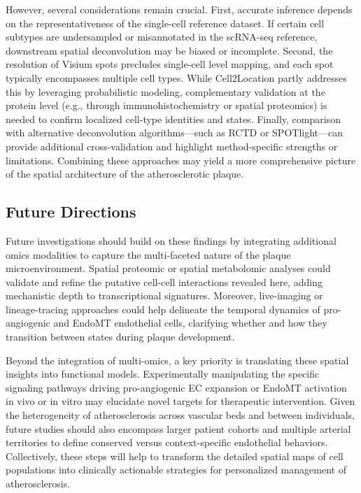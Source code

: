 \documentclass[a4paper,12pt]{article}
\begin{document}
However, several considerations remain crucial. First, accurate inference depends on the representativeness of the single-cell reference dataset. If certain cell subtypes are undersampled or misannotated in the scRNA-seq reference, downstream spatial deconvolution may be biased or incomplete. Second, the resolution of Visium spots precludes single-cell level mapping, and each spot typically encompasses multiple cell types. While Cell2Location partly addresses this by leveraging probabilistic modeling, complementary validation at the protein level (e.g., through immunohistochemistry or spatial proteomics) is needed to confirm localized cell-type identities and states. Finally, comparison with alternative deconvolution algorithms—such as RCTD or SPOTlight—can provide additional cross-validation and highlight method-specific strengths or limitations. Combining these approaches may yield a more comprehensive picture of the spatial architecture of the atherosclerotic plaque.

\subsection{Future Directions}
Future investigations should build on these findings by integrating additional omics modalities to capture the multi-faceted nature of the plaque microenvironment. Spatial proteomic or spatial metabolomic analyses could validate and refine the putative cell-cell interactions revealed here, adding mechanistic depth to transcriptional signatures. Moreover, live-imaging or lineage-tracing approaches could help delineate the temporal dynamics of pro-angiogenic and EndoMT endothelial cells, clarifying whether and how they transition between states during plaque development.

Beyond the integration of multi-omics, a key priority is translating these spatial insights into functional models. Experimentally manipulating the specific signaling pathways driving pro-angiogenic EC expansion or EndoMT activation in vivo or in vitro may elucidate novel targets for therapeutic intervention. Given the heterogeneity of atherosclerosis across vascular beds and between individuals, future studies should also encompass larger patient cohorts and multiple arterial territories to define conserved versus context-specific endothelial behaviors. Collectively, these steps will help to transform the detailed spatial maps of cell populations into clinically actionable strategies for personalized management of atherosclerosis.
\end{document}

